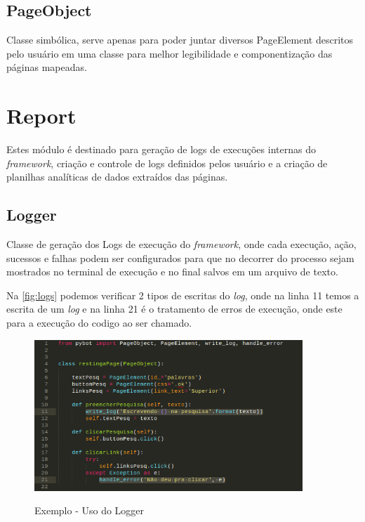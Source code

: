         \subsection{PageObject}
            Classe simbólica, serve apenas para poder juntar diversos PageElement descritos pelo usuário em uma classe para melhor
            legibilidade e componentização das páginas mapeadas.



    \section{Report}

        Estes módulo é destinado para geração de logs de execuções internas do \textit{framework}, criação e controle
        de logs definidos pelos usuário e a criação de planilhas analíticas de dados extraídos das páginas.

        \subsection{Logger}
        Classe de geração dos Logs de execução do \textit{framework}, onde cada execução, ação, sucessos e falhas podem ser configurados para que no decorrer do processo
        sejam mostrados no terminal de execução e no final salvos em um arquivo de texto.

        Na \autoref{fig:logs} podemos verificar 2 tipos de escritas do \textit{log}, onde na linha 11 temos a escrita de um \textit{log} e na linha 21 é o tratamento
        de erros de execução, onde este para a execução do codigo ao ser chamado.

        \begin{figure}[H]
            \vspace*{0,3cm}
            \centering
            \caption{Exemplo - Uso do Logger}
            \includegraphics[width=0.9\textwidth]{./04-figuras/logs}
            \label{fig:logs}
        \end{figure}


